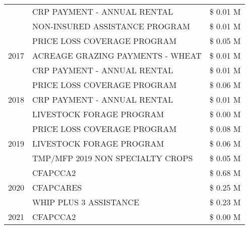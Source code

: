 \begin{tabular}{llr}
 & CRP PAYMENT - ANNUAL RENTAL & \$ 0.01 M \\
 & NON-INSURED ASSISTANCE PROGRAM & \$ 0.01 M \\
\cline{1-3}
\multirow[t]{3}{*}{2017} & PRICE LOSS COVERAGE PROGRAM & \$ 0.05 M \\
 & ACREAGE GRAZING PAYMENTS - WHEAT & \$ 0.01 M \\
 & CRP PAYMENT - ANNUAL RENTAL & \$ 0.01 M \\
\cline{1-3}
\multirow[t]{3}{*}{2018} & PRICE LOSS COVERAGE PROGRAM & \$ 0.06 M \\
 & CRP PAYMENT - ANNUAL RENTAL & \$ 0.01 M \\
 & LIVESTOCK FORAGE PROGRAM & \$ 0.00 M \\
\cline{1-3}
\multirow[t]{3}{*}{2019} & PRICE LOSS COVERAGE PROGRAM & \$ 0.08 M \\
 & LIVESTOCK FORAGE PROGRAM & \$ 0.06 M \\
 & TMP/MFP 2019 NON SPECIALTY CROPS & \$ 0.05 M \\
\cline{1-3}
\multirow[t]{3}{*}{2020} & CFAPCCA2 & \$ 0.68 M \\
 & CFAPCARES & \$ 0.25 M \\
 & WHIP PLUS 3 ASSISTANCE & \$ 0.23 M \\
\cline{1-3}
2021 & CFAPCCA2 & \$ 0.00 M \\
\cline{1-3}
\bottomrule
\end{tabular}
